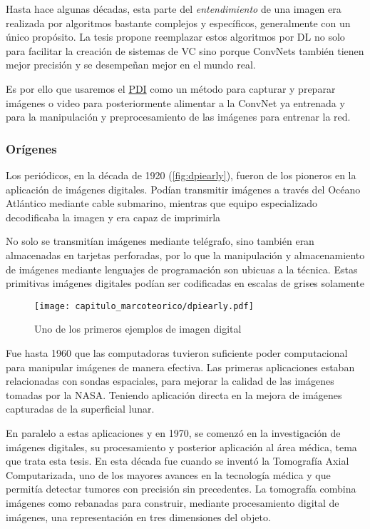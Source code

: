 Hasta hace algunas décadas, esta parte del \emph{entendimiento} de una imagen
era realizada por algoritmos bastante complejos y específicos, generalmente con
un único propósito. La tesis propone reemplazar estos algoritmos por DL no solo
para facilitar la creación de sistemas de VC sino porque ConvNets también tienen
mejor precisión y se desempeñan mejor en el mundo real. 

Es por ello que usaremos el \hyperlink{abbr}{PDI} como un método para capturar y preparar imágenes
o video para posteriormente alimentar a la ConvNet ya entrenada y para la
manipulación y preprocesamiento de las imágenes para entrenar la red. 

\subsubsection{Orígenes}

Los periódicos, en la década de 1920 (\autoref{fig:dpiearly}), fueron de los
pioneros en la aplicación de imágenes digitales. Podían transmitir imágenes a
través del Océano Atlántico mediante cable submarino, mientras que equipo
especializado decodificaba la imagen y era capaz de imprimirla

No solo se transmitían imágenes mediante telégrafo, sino también eran
almacenadas en tarjetas perforadas, por lo que la manipulación y almacenamiento
de imágenes mediante lenguajes de programación son ubicuas a la técnica. Estas
primitivas imágenes digitales podían ser codificadas en escalas de grises
solamente

\begin{figure}[H]
    \centering
    \texttt{[image: capitulo\_marcoteorico/dpiearly.pdf]}
    \caption{Uno de los primeros ejemplos de imagen digital}\label{fig:dpiearly}
\end{figure}

Fue hasta 1960 que las computadoras tuvieron suficiente poder computacional para
manipular imágenes de manera efectiva. Las primeras aplicaciones estaban
relacionadas con sondas espaciales, para mejorar la calidad de las imágenes
tomadas por la NASA. Teniendo aplicación directa en la mejora de imágenes
capturadas de la superficial lunar.

En paralelo a estas aplicaciones y en 1970, se comenzó en la investigación de
imágenes digitales, su procesamiento y posterior aplicación al área médica, tema
que trata esta tesis. En esta década fue cuando se inventó la Tomografía Axial
Computarizada, uno de los mayores avances en la tecnología médica y que permitía
detectar tumores con precisión sin precedentes. La tomografía combina imágenes
como rebanadas para construir, mediante procesamiento digital de imágenes, una
representación en tres dimensiones del objeto.

